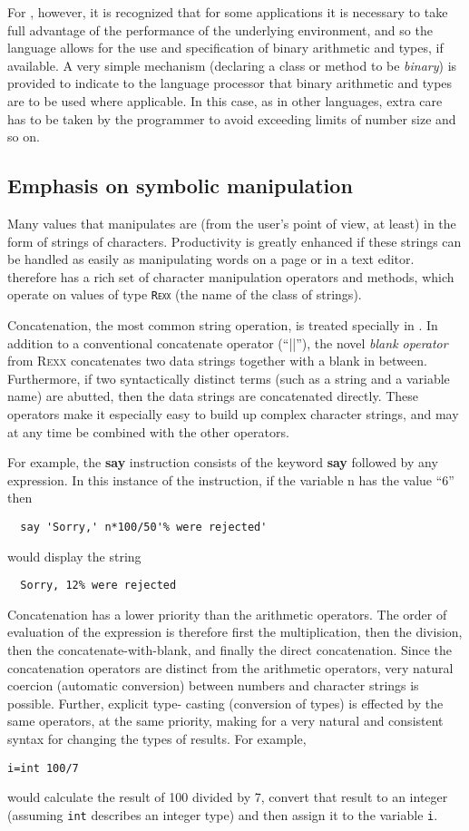 For \nr{}, however, it is recognized that for some applications it
is necessary to take full advantage of the performance of the
underlying environment, and so the language allows for the use and
specification of binary arithmetic and types, if available. A very
simple mechanism (declaring a class or method to be \emph{binary}) is
provided to indicate to the language processor that binary arithmetic
and types are to be used where applicable. In this case, as in other
languages, extra care has to be taken by the programmer to avoid
exceeding limits of number size and so on.
\subsection{Emphasis on symbolic manipulation}
Many values that \nr{} manipulates are (from the user’s point of view, at least) in the form of strings of characters. Productivity is greatly enhanced if these strings can be handled as easily as manipulating words on a page or in a text editor. \nr{} therefore has a rich set of character manipulation operators and methods, which operate on values of type \texttt{R\textsc{exx}} (the name of the class of \nr{} strings).

Concatenation, the most common string operation, is treated specially
in \nr{}. In addition to a conventional concatenate operator (“||”),
the novel \emph{blank operator} from R\textsc{exx} concatenates two data
strings together with a blank in between. Furthermore, if two
syntactically distinct terms (such as a string and a variable name)
are abutted, then the data strings are concatenated directly. These
operators make it especially easy to build up complex character
strings, and may at any time be combined with the other operators.

For example, the \textbf{say} instruction consists of the keyword \textbf{say} followed
by any expression. In this instance of the instruction, if the
variable n has the value “6” then
\begin{verbatim}
  say 'Sorry,' n*100/50'% were rejected'
\end{verbatim}
would display the string
\begin{verbatim}
  Sorry, 12% were rejected
\end{verbatim}
Concatenation has a lower priority than the arithmetic operators. The order of evaluation of the expression is therefore first the multiplication, then the division, then the concatenate-with-blank, and finally the direct concatenation.
Since the concatenation operators are distinct from the arithmetic
operators, very natural coercion (automatic conversion) between
numbers and character strings is possible. Further, explicit type-
casting (conversion of types) is effected by the same operators, at
the same priority, making for a very natural and consistent syntax for
changing the types of results. For example,
\begin{verbatim}
i=int 100/7
\end{verbatim}
would calculate the result of 100 divided by 7, convert that result to
an integer (assuming \texttt{int} describes an integer type) and then
assign it to the variable \texttt{i}.
